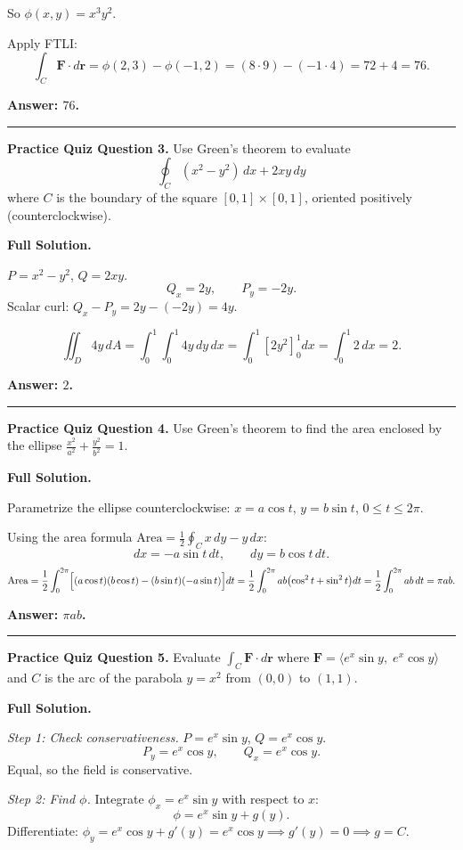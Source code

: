 \documentclass[11pt]{article}
\begin{document}
So $\phi(x,y) = x^3 y^2$.

Apply FTLI:
\[
  \int_C \mathbf{F}\cdot d\mathbf{r} = \phi(2,3) - \phi(-1,2) = (8 \cdot 9) - (-1 \cdot 4) = 72 + 4 = 76.
\]

\textbf{Answer: $76$.}

\bigskip
\hrule
\bigskip

\textbf{Practice Quiz Question 3.} Use Green's theorem to evaluate
\[
  \oint_C (x^2 - y^2)\,dx + 2xy\,dy
\]
where $C$ is the boundary of the square $[0,1]\times[0,1]$, oriented positively (counterclockwise).

\textbf{Full Solution.}

$P = x^2 - y^2$, $Q = 2xy$.
\[
  Q_x = 2y, \qquad P_y = -2y.
\]
Scalar curl: $Q_x - P_y = 2y - (-2y) = 4y$.

\[
  \iint_D 4y\,dA = \int_0^1\int_0^1 4y\,dy\,dx
  = \int_0^1 \left[2y^2\right]_0^1 dx
  = \int_0^1 2\,dx = 2.
\]

\textbf{Answer: $2$.}

\bigskip
\hrule
\bigskip

\textbf{Practice Quiz Question 4.} Use Green's theorem to find the area enclosed by the ellipse $\tfrac{x^2}{a^2} + \tfrac{y^2}{b^2} = 1$.

\textbf{Full Solution.}

Parametrize the ellipse counterclockwise: $x = a\cos t$, $y = b\sin t$, $0 \le t \le 2\pi$.

Using the area formula $\text{Area} = \tfrac{1}{2}\oint_C x\,dy - y\,dx$:
\[
  dx = -a\sin t\,dt, \qquad dy = b\cos t\,dt.
\]
\[
  \text{Area} = \frac{1}{2}\int_0^{2\pi} \Bigl[(a\cos t)(b\cos t) - (b\sin t)(-a\sin t)\Bigr]dt
  = \frac{1}{2}\int_0^{2\pi} ab\bigl(\cos^2 t + \sin^2 t\bigr)dt
  = \frac{1}{2}\int_0^{2\pi} ab\,dt = \pi ab.
\]

\textbf{Answer: $\pi ab$.}

\bigskip
\hrule
\bigskip

\textbf{Practice Quiz Question 5.} Evaluate $\int_C \mathbf{F}\cdot d\mathbf{r}$ where
$\mathbf{F} = \langle e^x\sin y,\; e^x\cos y \rangle$
and $C$ is the arc of the parabola $y = x^2$ from $(0,0)$ to $(1,1)$.

\textbf{Full Solution.}

\textit{Step 1: Check conservativeness.}
$P = e^x\sin y$, $Q = e^x\cos y$.
\[
  P_y = e^x\cos y, \qquad Q_x = e^x\cos y.
\]
Equal, so the field is conservative.

\textit{Step 2: Find $\phi$.}
Integrate $\phi_x = e^x\sin y$ with respect to $x$:
\[
  \phi = e^x\sin y + g(y).
\]
Differentiate: $\phi_y = e^x\cos y + g'(y) = e^x\cos y \implies g'(y) = 0 \implies g = C$.
\end{document}
